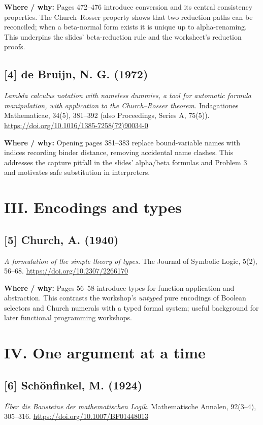 \documentclass[11pt]{article}
\begin{document}
\textbf{Where / why:} Pages 472--476 introduce conversion and its central consistency properties. The Church--Rosser property shows that two reduction paths can be reconciled; when a beta-normal form exists it is unique up to alpha-renaming. This underpins the slides' beta-reduction rule and the worksheet's reduction proofs.

\subsection*{[4] de Bruijn, N. G. (1972)}
\textit{Lambda calculus notation with nameless dummies, a tool for automatic formula manipulation, with application to the Church--Rosser theorem.} Indagationes Mathematicae, 34(5), 381--392 (also Proceedings, Series A, 75(5)).
\url{https://doi.org/10.1016/1385-7258(72)90034-0}

\textbf{Where / why:} Opening pages 381--383 replace bound-variable names with indices recording binder distance, removing accidental name clashes. This addresses the capture pitfall in the slides' alpha/beta formulas and Problem 3 and motivates safe substitution in interpreters.

\section*{III. Encodings and types}
\subsection*{[5] Church, A. (1940)}
\textit{A formulation of the simple theory of types.} The Journal of Symbolic Logic, 5(2), 56--68.
\url{https://doi.org/10.2307/2266170}

\textbf{Where / why:} Pages 56--58 introduce types for function application and abstraction. This contrasts the workshop's \emph{untyped} pure encodings of Boolean selectors and Church numerals with a typed formal system; useful background for later functional programming workshops.

\section*{IV. One argument at a time}
\subsection*{[6] Schönfinkel, M. (1924)}
\textit{Über die Bausteine der mathematischen Logik.} Mathematische Annalen, 92(3--4), 305--316.
\url{https://doi.org/10.1007/BF01448013}
\end{document}
